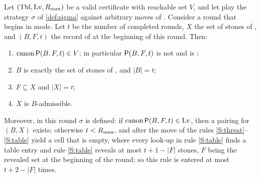 \begin{theorem}\label{thm:soundness}
Let $(\mathrm{Tbl},\mathrm{Lv},R_{\max})$ be a valid certificate with reachable set $V$, and let \Breaker{} play the strategy
$\sigma$ of \cref{def:sigma} against arbitrary moves of \Maker. Consider a round that begins in
\TABLE{} mode. Let $t$ be the number of completed rounds, $X$ the set of stones of \Maker, and $(B,F,t)$ the
record of \Breaker{} at the beginning of this round. Then:
\begin{enumerate}[label=\textup{(I\arabic*)},leftmargin=3em]
\item\label{I:V} $\operatorname{canon}\mathsf{P}(B,F,t)\in V$; in particular $\mathsf{P}(B,F,t)$ is not \VOID{} and is \WON;
\item\label{I:B} $B$ is exactly the set of stones of \Breaker, and $|B|=t$;
\item\label{I:F} $F\subseteq X$ and $|X|=t$;
\item\label{I:adm} $X$ is $B$-admissible.
\end{enumerate}
Moreover, in this round $\sigma$ is defined: if $\operatorname{canon}\mathsf{P}(B,F,t)\in\mathrm{Lv}$, then a pairing for $(B,X)$ exists;
otherwise $t<R_{\max}$, and after the move of \Maker{} the rules \ref{S:threat}--\ref{S:table} yield a cell that
is empty, where every look-up in rule \ref{S:table} finds a table entry and rule \ref{S:table} reveals at
most $t+1-|F|$ stones, $F$ being the revealed set at the beginning of the round; so this rule is entered at
most $t+2-|F|$ times.
\end{theorem}

